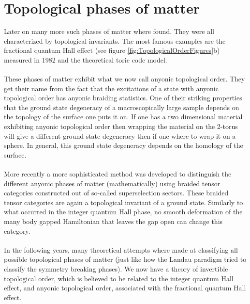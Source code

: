 \section{Topological phases of matter}
Later on many more such phases of matter where found. They were all characterized by topological invariants. The most famous examples are the fractional quantum Hall effect (see figure \ref{fig:TopologicalOrderFigures}b) measured in 1982 and the theoretical toric code model. 
\\\\
These phases of matter exhibit what we now call anyonic topological order. They get their name from the fact that the excitations of a state with anyonic topological order has anyonic braiding statistics. One of their striking properties that the ground state degeneracy of a macroscopically large sample depends on the topology of the surface one puts it on. If one has a two dimensional material exhibiting anyonic topological order then wrapping the material on the 2-torus will give a different ground state degeneracy then if one where to wrap it on a sphere. In general, this ground state degeneracy depends on the homology of the surface.
\\\\
More recently a more sophisticated method was developed to distinguish the different anyonic phases of matter (mathematically) using braided tensor categories constructed out of so-called superselection sectors. These braided tensor categories are again a topological invariant of a ground state. Similarly to what occurred in the integer quantum Hall phase, no smooth deformation of the many body gapped Hamiltonian that leaves the gap open can change this category.
\\\\
In the following years, many theoretical attempts where made at classifying all possible topological phases of matter (just like how the Landau paradigm tried to classify the symmetry breaking phases). We now have a theory of invertible topological order, which is believed to be related to the integer quantum Hall effect, and anyonic topological order, associated with the fractional quantum Hall effect.
